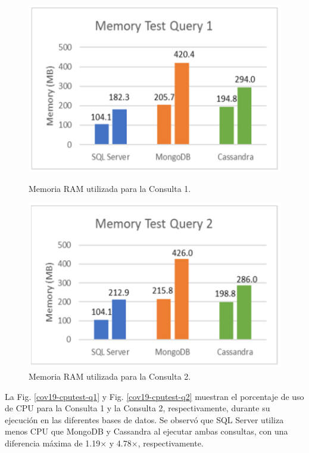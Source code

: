 \documentclass[pdflatex,sn-mathphys-num]{sn-jnl}
\theoremstyle{thmstyleone}%
\theoremstyle{thmstyletwo}%
\theoremstyle{thmstylethree}%
\begin{document}
\begin{figure}[H]
    \centering
    \begin{minipage}[b]{0.48\textwidth}
        \centering
        \includegraphics[width=\textwidth]{figs/cov19-mem-test-q1.png}
        \caption{Memoria RAM utilizada para la Consulta 1.}
        \label{cov19-memtest-q1}
    \end{minipage}
    \hfill
    \begin{minipage}[b]{0.48\textwidth}
        \centering
        \includegraphics[width=\textwidth]{figs/cov19-mem-test-q2.png}
        \caption{Memoria RAM utilizada para la Consulta 2.}
        \label{cov19-memtest-q2}
    \end{minipage}
\end{figure}

\vspace{-0.5cm}

La Fig. \ref{cov19-cputest-q1} y Fig. \ref{cov19-cputest-q2} muestran el porcentaje de uso de CPU para la Consulta 1 y la Consulta 2, respectivamente, durante su ejecución en las diferentes bases de datos. Se observó que SQL Server utiliza menos CPU que MongoDB y Cassandra al ejecutar ambas consultas, con una diferencia máxima de 1.19× y 4.78×, respectivamente.
\end{document}
